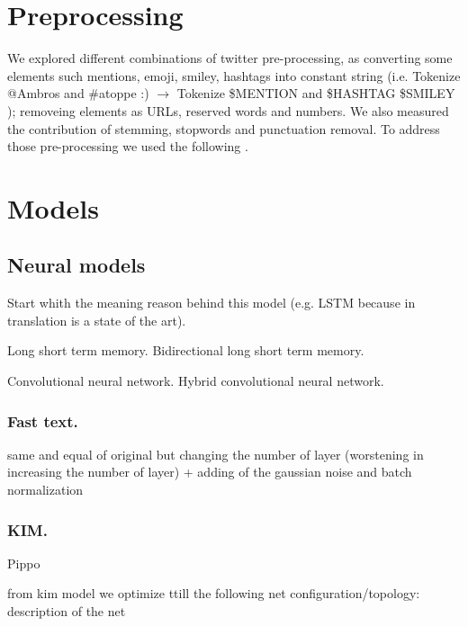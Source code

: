 \section{Preprocessing}
We explored different combinations of twitter pre-processing, as converting some elements such mentions, emoji, smiley, hashtags into constant string (i.e. Tokenize @Ambros and \#atoppe :) $\rightarrow $ Tokenize \$MENTION and \$HASHTAG \$SMILEY ); removeing elements as URLs, reserved words and numbers.
We also measured the contribution of stemming, stopwords and punctuation removal.
To address those pre-processing we used the following \cite{nltk} \cite{tweets-preprocessor}.


\section{Models}

 	

\subsection{Neural models}

Start whith the meaning reason behind this model (e.g. LSTM because in translation is a state of the art).

Long short term memory.
Bidirectional long short term memory.

Convolutional neural network.
Hybrid convolutional neural network.

\subsubsection{Fast text.}

same and equal of original but changing the number of layer  (worstening in increasing the number of layer) + adding of the gaussian noise and batch normalization

\subsubsection{KIM.}

Pippo \cite{kim2014convolutional}



from kim model we optimize ttill the following net configuration/topology: description of the net
